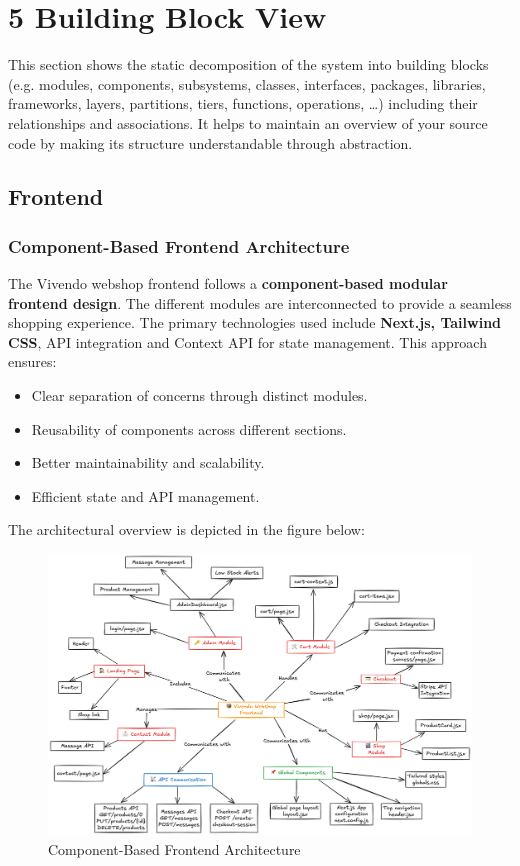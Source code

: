 \hypertarget{section-building-block-view}{%
\section{5 Building Block View}\label{section-building-block-view}}

This section shows the static decomposition of the system into building blocks (e.g. modules, components, subsystems, classes, interfaces, packages, libraries, frameworks, layers, partitions, tiers, functions, operations, \ldots) including their relationships and associations. It helps to maintain an overview of your source code by making its structure understandable through abstraction.

\subsection{Frontend}
\subsubsection{Component-Based Frontend Architecture}
The Vivendo webshop frontend follows a \textbf{component-based modular frontend design}. The different modules are interconnected to provide a seamless shopping experience. The primary technologies used include \textbf{Next.js, Tailwind CSS}, API integration and Context API for state management. This approach ensures:
\begin{itemize}
    \item Clear separation of concerns through distinct modules.
    \item Reusability of components across different sections.
    \item Better maintainability and scalability.
    \item Efficient state and API management.
\end{itemize}
The architectural overview is depicted in the figure below:

\begin{figure}[h]
    \centering
    \includegraphics[width=\textwidth]{images/New_frontend_architecture.png}
    \caption{Component-Based Frontend Architecture}
    \label{fig:architecture}
\end{figure}

